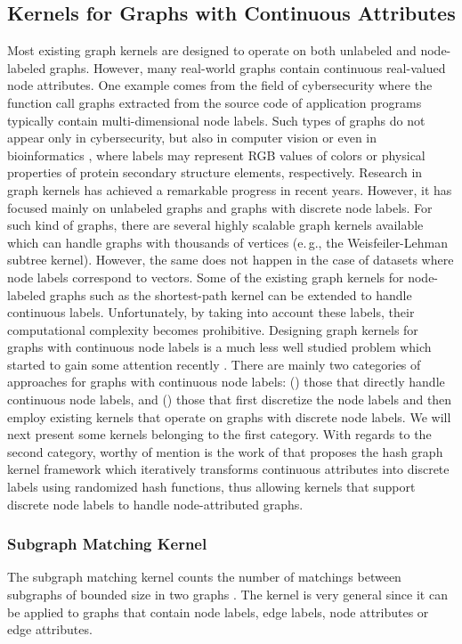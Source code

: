 \documentclass[twoside,11pt]{article}
\newcommand{\eg}{e.\,g., }
\begin{document}
\subsection{Kernels for Graphs with Continuous Attributes}
Most existing graph kernels are designed to operate on both unlabeled and node-labeled graphs.
However, many real-world graphs contain continuous real-valued node attributes.
One example comes from the field of cybersecurity where the function call graphs extracted from the source code of application programs typically contain multi-dimensional node labels. 
Such types of graphs do not appear only in cybersecurity, but also in computer vision  or even in bioinformatics , where labels may represent RGB values of colors or physical properties of protein secondary structure elements, respectively.
Research in graph kernels has achieved a remarkable progress in recent years.
However, it has focused mainly on unlabeled graphs and graphs with discrete node labels.
For such kind of graphs, there are several highly scalable graph kernels available which can handle graphs with thousands of vertices (\eg the Weisfeiler-Lehman subtree kernel).
However, the same does not happen in the case of datasets where node labels correspond to vectors.
Some of the existing graph kernels for node-labeled graphs such as the shortest-path kernel can be extended to handle continuous labels.
Unfortunately, by taking into account these labels, their computational complexity becomes prohibitive.
Designing graph kernels for graphs with continuous node labels is a much less well studied problem which started to gain some attention recently .
There are mainly two categories of approaches for graphs with continuous node labels: () those that directly handle continuous node labels, and () those that first discretize the node labels and then employ existing kernels that operate on graphs with discrete node labels.
We will next present some kernels belonging to the first category.
With regards to the second category, worthy of mention is the work of  that proposes the hash graph kernel framework which iteratively transforms continuous attributes into discrete labels using randomized hash functions, thus allowing kernels that support discrete node labels to handle node-attributed graphs.


\subsubsection{Subgraph Matching Kernel}
The subgraph matching kernel counts the number of matchings between subgraphs of bounded size in two graphs .
The kernel is very general since it can be applied to graphs that contain node labels, edge labels, node attributes or edge attributes.
\end{document}
